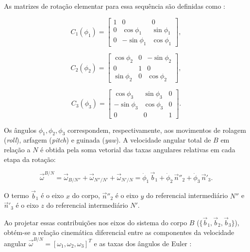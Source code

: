 As matrizes de rotação elementar para essa sequência são definidas como \cite{wie2008space}:

\begin{equation}
C_1(\phi_1)=
\begin{bmatrix}
1 & 0 & 0 \\
0 & \cos\phi_1 & \sin\phi_1 \\
0 & -\sin\phi_1 & \cos\phi_1
\end{bmatrix},
\label{eq_C1_phi1}
\end{equation}

\begin{equation}
C_2(\phi_2)=
\begin{bmatrix}
\cos\phi_2 & 0 & -\sin\phi_2 \\
0 & 1 & 0 \\
\sin\phi_2 & 0 & \cos\phi_2
\end{bmatrix},
\label{eq_C2_phi2}
\end{equation}

\begin{equation}
C_3(\phi_3)=
\begin{bmatrix}
\cos\phi_3 & \sin\phi_3 & 0 \\
-\sin\phi_3 & \cos\phi_3 & 0 \\
0 & 0 & 1
\end{bmatrix}.
\label{eq_C3_phi3}
\end{equation}

Os ângulos $\phi_1, \phi_2, \phi_3$ correspondem, respectivamente, aos movimentos de rolagem (\textit{roll}), arfagem (\textit{pitch}) e guinada (\textit{yaw}).
A velocidade angular total de $B$ em relação a $N$ é obtida pela soma vetorial das taxas angulares relativas em cada etapa da rotação:

\begin{equation}
\vec{\omega}^{B/N}
=
\vec{\omega}_{B/N''}
+
\vec{\omega}_{N''/N'}
+
\vec{\omega}_{N'/N}
=
\dot{\phi}_1\,\vec{b}_1
+
\dot{\phi}_2\,\vec{n}''_2
+
\dot{\phi}_3\,\vec{n}'_3.
\label{eq_omega_soma_contrib}
\end{equation}

O termo $\vec{b}_1$ é o eixo $x$ do corpo, $\vec{n}''_2$ é o eixo $y$ do referencial intermediário $N''$ e $\vec{n}'_3$ é o eixo $z$ do referencial intermediário $N'$.

Ao projetar essas contribuições nos eixos do sistema do corpo $B$ ($\{\vec{b}_1, \vec{b}_2, \vec{b}_3\}$), obtém-se a relação cinemática diferencial entre as componentes da velocidade angular $\vec{\omega}^{B/N} = [\omega_1, \omega_2, \omega_3]^T$ e as taxas dos ângulos de Euler \cite{wie2008space}:

